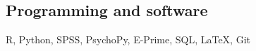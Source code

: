 \documentclass[margin, 11pt]{res} %
\begin{document}
\begin{resume}
\section{\sc Programming and software}

R, Python, SPSS, PsychoPy, E-Prime, SQL, \LaTeX, Git




%
%
 



%


\end{resume}
\end{document}
